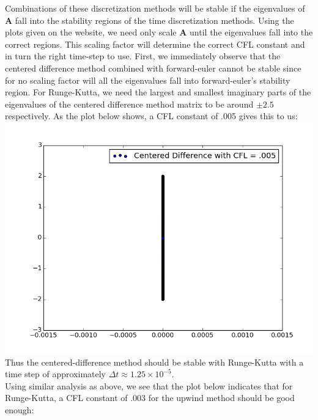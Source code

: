 \documentclass[a4paper, 12pt]{article}
\begin{document}
\begin{enumerate}[(a)]
\begin{enumerate}[(i)]
	\end{enumerate}
	Combinations of these discretization methods will be stable if the eigenvalues of \textbf{A} fall into the stability regions of the time discretization methods. Using the plots given on the website, we need only scale \textbf{A} until the eigenvalues fall into the correct regions. This scaling factor will determine the correct CFL constant and in turn the right time-step to use. First, we immediately observe that the centered difference method combined with forward-euler cannot be stable since for no scaling factor will all the eigenvalues fall into forward-euler's stability region. For Runge-Kutta, we need the largest and smallest imaginary parts of the eigenvalues of the centered difference method matrix to be around $\pm 2.5$ respectively. As the plot below shows, a CFL constant of .005 gives this to us: \\
	\includegraphics[scale=.5]{fig5_3.png}\hfill\\
	Thus the centered-difference method should be stable with Runge-Kutta with a time step of approximately $\Delta t \approx 1.25\times 10^{-5}$. \\
	Using similar analysis as above, we see that the plot below indicates that for Runge-Kutta, a CFL constant of .003 for the upwind method should be good enough: \\

\end{enumerate}
\end{document}
